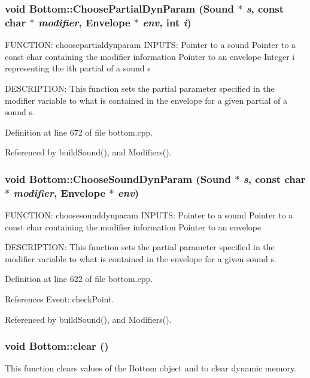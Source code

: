 \subsubsection{\setlength{\rightskip}{0pt plus 5cm}void Bottom::Choose\-Partial\-Dyn\-Param (Sound $\ast$ {\em s}, const char $\ast$ {\em modifier}, Envelope $\ast$ {\em env}, int {\em i})}\label{classBottom_a25}


FUNCTION: choosepartialdynparam INPUTS: Pointer to a sound Pointer to a const char containing the modifier information Pointer to an envelope Integer i representing the ith partial of a sound s

DESCRIPTION: This function sets the partial parameter specified in the modifier variable to what is contained in the envelope for a given partial of a sound s. 

Definition at line 672 of file bottom.cpp.

Referenced by build\-Sound(), and Modifiers().
\subsubsection{\setlength{\rightskip}{0pt plus 5cm}void Bottom::Choose\-Sound\-Dyn\-Param (Sound $\ast$ {\em s}, const char $\ast$ {\em modifier}, Envelope $\ast$ {\em env})}\label{classBottom_a24}


FUNCTION: choosesounddynparam INPUTS: Pointer to a sound Pointer to a const char containing the modifier information Pointer to an envelope

DESCRIPTION: This function sets the partial parameter specified in the modifier variable to what is contained in the envelope for a given sound s. 

Definition at line 622 of file bottom.cpp.

References Event::check\-Point.

Referenced by build\-Sound(), and Modifiers().
\subsubsection{\setlength{\rightskip}{0pt plus 5cm}void Bottom::clear ()\hspace{0.3cm}{\tt  [virtual]}}\label{classBottom_a5}


This function clears values of the Bottom object and to clear dynamic memory. 

